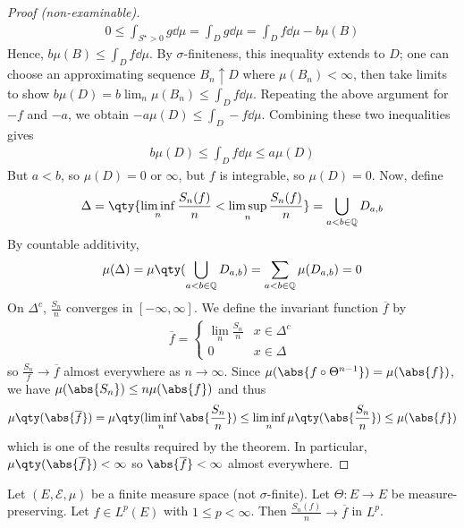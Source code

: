 \begin{proof}[Proof (non-examinable)]
\begin{align*}
        0 \leq \int_{S^\star > 0} g \dd{\mu} = \int_D g \dd{\mu} = \int_D f \dd{\mu} - b \mu(B)
    \end{align*}
    Hence, $b \mu(B) \leq \int_D f \dd{\mu}$.
    By $\sigma$-finiteness, this inequality extends to $D$; one can choose an approximating sequence $B_n \uparrow D$ where $\mu(B_n) < \infty$, then take limits to show $b\mu(D) = b \lim_n \mu(B_n) \leq \int_D f \dd{\mu}$.
    Repeating the above argument for $-f$ and $-a$, we obtain $-a\mu(D) \leq \int_D -f \dd{\mu}$.
    Combining these two inequalities gives
    \begin{align*}
        b\mu(D) \leq \int_D f \dd{\mu} \leq a\mu(D)
    \end{align*}
    But $a < b$, so $\mu(D) = 0$ or $\infty$, but $f$ is integrable, so $\mu(D) = 0$.
    Now, define
    \begin{align*}
        \Delta = \qty{\liminf_n \frac{S_n(f)}{n} < \limsup_n \frac{S_n(f)}{n}}  = \bigcup_{a < b \in \mathbb Q} D_{a,b}
    \end{align*}
    By countable additivity,
    \begin{align*}
        \mu(\Delta) = \mu\qty(\bigcup_{a < b \in \mathbb Q} D_{a,b}) = \sum_{a < b \in \mathbb Q} \mu(D_{a,b}) = 0
    \end{align*}
    On $\Delta^c$, $\frac{S_n}{n}$ converges in $[-\infty, \infty]$.
    We define the invariant function $\overline f$ by
    \begin{align*}
        \overline f = \begin{cases}
        \lim_n \frac{S_n}{n} & x \in \Delta^c \\
        0 & x \in \Delta
    \end{cases}
    \end{align*}
    so $\frac{S_n}{f} \to \overline f$ almost everywhere as $n \to \infty$.
    Since $\mu(\abs{f \circ \Theta^{n-1}}) = \mu(\abs{f})$, we have $\mu(\abs{S_n}) \leq n \mu(\abs{f})$ and thus
    \begin{align*}
        \mu\qty(\abs{\overline f}) = \mu\qty(\liminf_n \abs{\frac{S_n}{n}}) \leq \liminf_n \mu\qty(\abs{\frac{S_n}{n}}) \leq \mu(\abs{f})
    \end{align*}
    which is one of the results required by the theorem.
    In particular, $\mu\qty(\abs{\overline f}) < \infty$ so $\abs{\overline f} < \infty$ almost everywhere.
\end{proof}
\begin{theorem}
	Let $(E, \mathcal E, \mu)$ be a finite measure space (not $\sigma$-finite).
	Let $\Theta \colon E \to E$ be measure-preserving.
	Let $f \in L^p(E)$ with $1 \leq p < \infty$.
	Then $\frac{S_n(f)}{n} \to \overline f$ in $L^p$.
\end{theorem}

